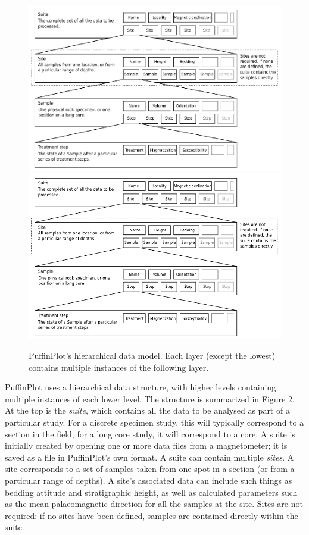 \documentclass[a4paper,british]{article}
\begin{document}
\begin{figure}[htbp]
\centering
\ifpdf\includegraphics{figures/data-model.pdf}
\else\includegraphics{figures/data-model.png}
\fi
\caption{PuffinPlot's hierarchical data model. Each layer (except the
lowest) contains multiple instances of the following layer.}
\end{figure}

PuffinPlot uses a hierarchical data structure, with higher levels containing
multiple instances of each lower level. The structure is summarized in Figure
2. At the top is the \emph{suite}, which contains all the data to be analysed
as part of a particular study. For a discrete specimen study, this will
typically correspond to a section in the field; for a long core study, it
will correspond to a core. A suite is initially created by opening one or
more data files from a magnetometer; it is saved as a file in PuffinPlot's
own format. A suite can contain multiple \emph{sites}. A site corresponds to
a set of samples taken from one spot in a section (or from a particular range
of depths). A site's associated data can include such things as bedding
attitude and stratigraphic height, as well as calculated parameters such as
the mean palaeomagnetic direction for all the samples at the site. Sites are
not required: if no sites have been defined, samples are contained directly
within the suite.
\end{document}
